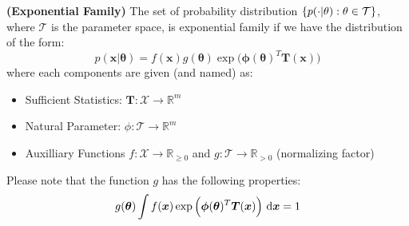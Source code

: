 \begin{definition}{\textbf{(Exponential Family)}}
    The set of probability distribution $\left\{ p(\cdot|\theta) : \theta \in \mathcal{T} \right\}$, where $\mathcal{T}$ is the parameter space, is exponential family if we have the distribution of the form:
    \begin{equation*}
        p(\boldsymbol x | \boldsymbol \theta) = f(\boldsymbol x)g(\boldsymbol \theta)\exp\Big( \boldsymbol \phi(\boldsymbol \theta)^T\boldsymbol T(\boldsymbol x) \Big) 
    \end{equation*}
    where each components are given (and named) as:
    \begin{itemize}
        \item Sufficient Statistics: $\boldsymbol T : \mathcal{X} \rightarrow \mathbb{R}^m$
        \item Natural Parameter: $\phi : \mathcal{T}\rightarrow \mathbb{R}^m$
        \item Auxilliary Functions $f: \mathcal{X} \rightarrow \mathbb{R}_{\ge0}$ and $g : \mathcal{T}\rightarrow \mathbb{R}_{>0}$ (normalizing factor)
    \end{itemize}
    Please note that the function $g$ has the following properties:
    \begin{equation*}
        g(\boldsymbol \theta)\int f(\boldsymbol x)\exp\Big( \boldsymbol \phi(\boldsymbol \theta)^T\boldsymbol T(\boldsymbol x) \Big) \ \mathrm{d} \boldsymbol x = 1
    \end{equation*}
\end{definition}

